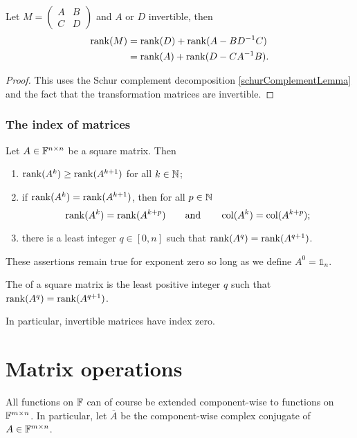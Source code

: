 \begin{proposition}
Let $M=\begin{pmatrix}
A & B \\ C & D
\end{pmatrix}$ and $A$ or $D$ invertible, then
\begin{align*}
\operatorname{rank}(M) &= \operatorname{rank}(D) + \operatorname{rank}(A-BD^{-1}C) \\
&= \operatorname{rank}(A) + \operatorname{rank}(D-CA^{-1}B).
\end{align*}
\end{proposition}
\begin{proof}
This uses the Schur complement decomposition \ref{schurComplementLemma} and the fact that the transformation matrices are invertible.
\end{proof}

\subsubsection{The index of matrices}
\begin{proposition}
Let $A\in\mathbb{F}^{n\times n}$ be a square matrix. Then
\begin{enumerate}
\item $\operatorname{rank}(A^k)\geq \operatorname{rank}(A^{k+1})$ for all $k\in\mathbb{N}$;
\item if $\operatorname{rank}(A^k) = \operatorname{rank}(A^{k+1})$, then for all $p\in\mathbb{N}$
\[ \operatorname{rank}(A^k) = \operatorname{rank}(A^{k+p}) \qquad\text{and}\qquad \operatorname{col}(A^k) = \operatorname{col}(A^{k+p}); \]
\item there is a least integer $q\in [0,n]$ such that $\operatorname{rank}(A^q) = \operatorname{rank}(A^{q+1})$.
\end{enumerate}
\end{proposition}
These assertions remain true for exponent zero so long as we define $A^0 = \mathbb{1}_n$.

\begin{definition}
The  of a square matrix is the least positive integer $q$ such that $\operatorname{rank}(A^q) = \operatorname{rank}(A^{q+1})$.
\end{definition}
In particular, invertible matrices have index zero.

\section{Matrix operations}
All functions on $\mathbb{F}$ can of course be extended component-wise to functions on $\mathbb{F}^{m\times n}$. In particular, let $\overline{A}$ be the component-wise complex conjugate of $A\in\mathbb{F}^{m\times n}$.
